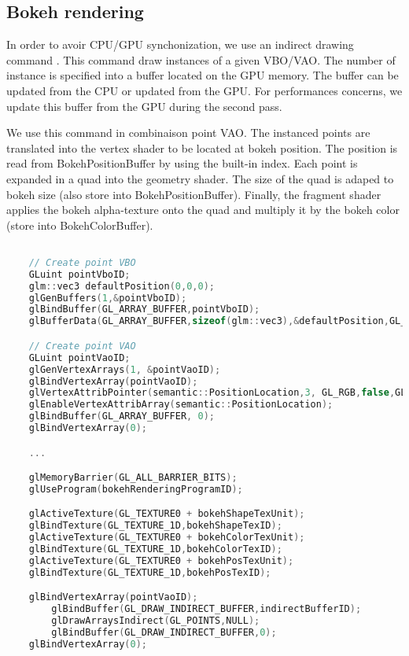 \subsection{Bokeh rendering}
In order to avoir CPU/GPU synchonization, we use an indirect drawing command . This command draw instances of a given VBO/VAO. The number of instance is specified into a buffer located on the GPU memory. The buffer can be updated from the CPU or updated from the GPU. For performances concerns, we update this buffer from the GPU during the second pass. 

We use this command in combinaison point VAO. The instanced points are translated into the vertex shader to be located at bokeh position. The position is read from BokehPositionBuffer by using the built-in  index. Each point is expanded in a quad into the geometry shader. The size of the quad is adaped to bokeh size (also store into BokehPositionBuffer). Finally, the fragment shader applies the bokeh alpha-texture onto the quad and multiply it by the bokeh color (store into BokehColorBuffer).


\begin{lstlisting}[language=C++,float={htb},caption={Your caption.},label={YourName:listing1}]

	// Create point VBO
	GLuint pointVboID;
	glm::vec3 defaultPosition(0,0,0);
	glGenBuffers(1,&pointVboID);
	glBindBuffer(GL_ARRAY_BUFFER,pointVboID);
	glBufferData(GL_ARRAY_BUFFER,sizeof(glm::vec3),&defaultPosition,GL_STATIC_DRAW);

	// Create point VAO
	GLuint pointVaoID;
	glGenVertexArrays(1, &pointVaoID);
	glBindVertexArray(pointVaoID);
	glVertexAttribPointer(semantic::PositionLocation,3, GL_RGB,false,GL_FLOAT,GLF_BUFFER_OFFSET(_offset));
	glEnableVertexAttribArray(semantic::PositionLocation);
	glBindBuffer(GL_ARRAY_BUFFER, 0);
	glBindVertexArray(0);

	...

	glMemoryBarrier(GL_ALL_BARRIER_BITS);
	glUseProgram(bokehRenderingProgramID);

	glActiveTexture(GL_TEXTURE0 + bokehShapeTexUnit);
	glBindTexture(GL_TEXTURE_1D,bokehShapeTexID);
	glActiveTexture(GL_TEXTURE0 + bokehColorTexUnit);
	glBindTexture(GL_TEXTURE_1D,bokehColorTexID);
	glActiveTexture(GL_TEXTURE0 + bokehPosTexUnit);
	glBindTexture(GL_TEXTURE_1D,bokehPosTexID);

	glBindVertexArray(pointVaoID);
		glBindBuffer(GL_DRAW_INDIRECT_BUFFER,indirectBufferID);
		glDrawArraysIndirect(GL_POINTS,NULL);
		glBindBuffer(GL_DRAW_INDIRECT_BUFFER,0);
	glBindVertexArray(0);

\end{lstlisting}



